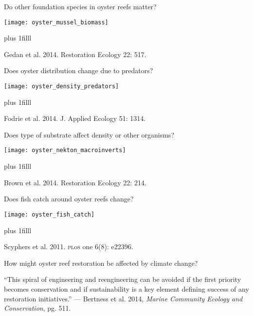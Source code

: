 \documentclass[t]{beamer}
\begin{document}
%
\begin{frame}[t]{Do other foundation species in oyster reefs matter?}

	\centering
		\texttt{[image: oyster\_mussel\_biomass]}
	
	
	\vskip0pt plus 1filll

\hfill\tiny Gedan et al. 2014. Restoration Ecology 22: 517.
\end{frame}
%
%
\begin{frame}[t]{Does oyster distribution change due to predators?}

	\centering
		\texttt{[image: oyster\_density\_predators]}
	
	
	\vskip0pt plus 1filll

\hfill\tiny Fodrie et al. 2014. J. Applied Ecology 51: 1314.
\end{frame}
%
%
\begin{frame}[t]{Does type of substrate affect density or other organisms?}

	\centering
		\texttt{[image: oyster\_nekton\_macroinverts]}
	
	
	\vskip0pt plus 1filll

\hfill\tiny Brown et al. 2014. Restoration Ecology 22: 214.
\end{frame}
%

%
\begin{frame}[t]{Does fish catch around oyster reefs change?}

	\centering
		\texttt{[image: oyster\_fish\_catch]}
	
	
	\vskip0pt plus 1filll

\hfill\tiny Scyphers et al. 2011. \textsc{pl}o\textsc{s} one 6(8): e22396.
\end{frame}
%
\begin{frame}[t]{How might oyster reef restoration be affected by climate change?}

\vspace*{2\baselineskip}

\hangpara “This spiral of engineering and reengineering can be avoided if the first priority becomes conservation and if sustainability is a key element defining success of any restoration initiatives.” — Bertness et al. 2014, \textit{Marine Community Ecology and Conservation}, pg. 511.
\end{frame}
\end{document}
